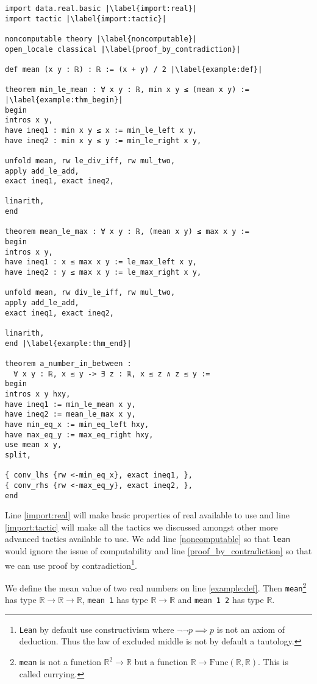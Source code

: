 \documentclass{report}
\theoremstyle{definition}
\theoremstyle{plain}
\begin{document}
\begin{verbatim}
import data.real.basic |\label{import:real}|
import tactic |\label{import:tactic}|
  
noncomputable theory |\label{noncomputable}|
open_locale classical |\label{proof_by_contradiction}|  

def mean (x y : ℝ) : ℝ := (x + y) / 2 |\label{example:def}|
  
theorem min_le_mean : ∀ x y : ℝ, min x y ≤ (mean x y) := |\label{example:thm_begin}|
begin
intros x y,
have ineq1 : min x y ≤ x := min_le_left x y,
have ineq2 : min x y ≤ y := min_le_right x y,
    
unfold mean, rw le_div_iff, rw mul_two, 
apply add_le_add, 
exact ineq1, exact ineq2, 
  
linarith,
end
  
theorem mean_le_max : ∀ x y : ℝ, (mean x y) ≤ max x y :=
begin
intros x y,
have ineq1 : x ≤ max x y := le_max_left x y,
have ineq2 : y ≤ max x y := le_max_right x y,
  
unfold mean, rw div_le_iff, rw mul_two,
apply add_le_add,
exact ineq1, exact ineq2,
  
linarith,
end |\label{example:thm_end}|
  
theorem a_number_in_between : 
  ∀ x y : ℝ, x ≤ y -> ∃ z : ℝ, x ≤ z ∧ z ≤ y :=
begin
intros x y hxy,
have ineq1 := min_le_mean x y,
have ineq2 := mean_le_max x y,
have min_eq_x := min_eq_left hxy,
have max_eq_y := max_eq_right hxy,
use mean x y,
split,
  
{ conv_lhs {rw <-min_eq_x}, exact ineq1, },
{ conv_rhs {rw <-max_eq_y}, exact ineq2, },
end

\end{verbatim}

Line \ref{import:real} will make basic properties of real available to use and line \ref{import:tactic} will make all the tactics we discussed amongst other more advanced tactics available to use. We add line \ref{noncomputable} so that {\tt lean} would ignore the issue of computability and line \ref{proof_by_contradiction} so that we can use proof by contradiction\footnote{{\tt Lean} by default use constructivism where $\neg\neg p\implies p$ is not an axiom of deduction. Thus the law of excluded middle is not by default a tautology.}. 

We define the mean value of two real numbers on line \ref{example:def}. Then {\tt mean}\footnote{{\tt mean} is not a function $\mathbb R^2\to\mathbb R$ but a function $\mathbb R\to\mathrm{Func}(\mathbb R,\mathbb R)$. This is called currying.} has type $\mathbb R\to \mathbb R\to \mathbb R$, {\tt mean 1} has type $\mathbb R\to \mathbb R$ and {\tt mean 1 2} has type $\mathbb R$. 
\end{document}
